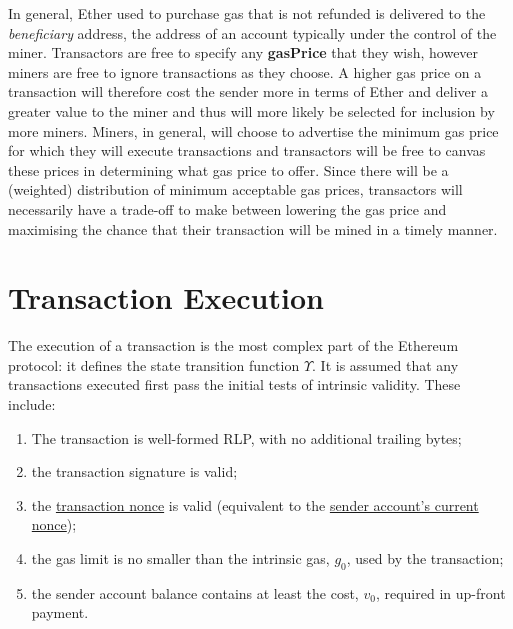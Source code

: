 \documentclass[9pt,oneside]{amsart}
\begin{document}
\begin{multicols}{2}
In general, Ether used to purchase gas that is not refunded is delivered to the \textit{beneficiary} address, the address of an account typically under the control of the miner. Transactors are free to specify any \textbf{gasPrice} that they wish, however miners are free to ignore transactions as they choose. A higher gas price on a transaction will therefore cost the sender more in terms of Ether and deliver a greater value to the miner and thus will more likely be selected for inclusion by more miners. Miners, in general, will choose to advertise the minimum gas price for which they will execute transactions and transactors will be free to canvas these prices in determining what gas price to offer. Since there will be a (weighted) distribution of minimum acceptable gas prices, transactors will necessarily have a trade-off to make between lowering the gas price and maximising the chance that their transaction will be mined in a timely manner.


\section{Transaction Execution} \label{ch:transactions}

The execution of a transaction is the most complex part of the Ethereum protocol: it defines the state transition function \hyperlink{Upsilon}{$\Upsilon$}. It is assumed that any transactions executed first pass the initial tests of intrinsic validity. These include:

\begin{enumerate}
\item The transaction is well-formed RLP, with no additional trailing bytes;
\item the transaction signature is valid;
\item the \hyperlink{transaction nonce}{transaction nonce} is valid (equivalent to the  \hyperlink{account nonce}{sender account's current nonce});
\item the gas limit is no smaller than the intrinsic gas, $g_0$, used by the transaction;
\item the sender account balance contains at least the cost, $v_0$, required in up-front payment.
\end{enumerate}


\end{multicols}
\end{document}
